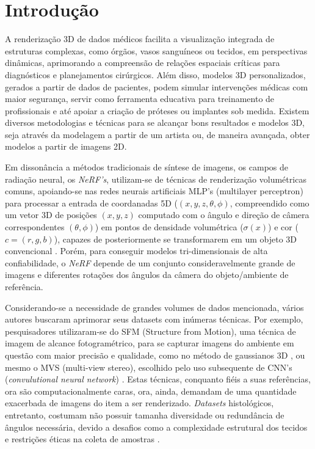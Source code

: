 \section{Introdução}
\label{sec:introducao}

A renderização 3D de dados médicos facilita a visualização integrada de estruturas complexas, como órgãos, vasos sanguíneos ou tecidos, em perspectivas dinâmicas, aprimorando a compreensão de relações espaciais críticas para diagnósticos e planejamentos cirúrgicos. Além disso, modelos 3D personalizados, gerados a partir de dados de pacientes, podem simular intervenções médicas com maior segurança, servir como ferramenta educativa para treinamento de profissionais e até apoiar a criação de próteses ou implantes sob medida. Existem diversos metodologias e técnicas para se alcançar bons resultados e modelos 3D, seja através da modelagem a partir de um artista ou, de maneira avançada, obter modelos a partir de imagens 2D.

Em dissonância a métodos tradicionais de síntese de imagens, os campos de radiação neural, os \textit{NeRF's}, utilizam-se de técnicas de renderização volumétricas comuns, apoiando-se nas redes neurais artificiais MLP's (multilayer perceptron) para processar a entrada de coordanadas 5D ($(x, y, z, \theta, \phi)$, compreendido como um vetor 3D de posições $(x, y, z)$ computado com o ângulo e direção de câmera correspondentes $(\theta, \phi)$) em pontos de densidade volumétrica ($\sigma (x)$) e cor ($c = (r, g, b)$), capazes de posteriormente se transformarem em um objeto 3D convencional \cite{mildenhall2020nerfrepresentingscenesneural}. Porém, para conseguir modelos tri-dimensionais de alta confiabilidade, o \textit{NeRF} depende de um conjunto consideravelmente grande de imagens e diferentes rotações dos ângulos da câmera do objeto/ambiente de referência.

Considerando-se a necessidade de grandes volumes de dados mencionada, vários autores buscaram aprimorar seus datasets com inúmeras técnicas. Por exemplo, pesquisadores utilizaram-se do SFM  (Structure from Motion), uma técnica de imagem de alcance fotogramétrico, para se capturar imagens do ambiente em questão com maior precisão e qualidade, como no método de gaussianos 3D \cite{kerbl3Dgaussians}, ou mesmo o MVS (multi-view stereo), escolhido pelo uso subsequente de CNN's (\textit{convulutional neural network}) \cite{chen2021mvsnerffastgeneralizableradiance}. Estas técnicas, conquanto fiéis a suas referências, ora são computacionalmente caras, ora, ainda, demandam de uma quantidade exacerbada de imagens do item a ser renderizado. \textit{Datasets} histológicos, entretanto, costumam não possuir tamanha diversidade ou redundância de ângulos necessária, devido a desafios como a complexidade estrutural dos tecidos e restrições éticas na coleta de amostras \cite{XUE2021101816}.

